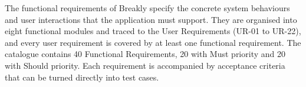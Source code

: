 \newcommand{\frone}[5]{#1 & #2 & #3 & #4 & #5 \\ \hline}
\newcommand{\frfirst}[5]{#1 & #2 & #3 & #4 & #5 \\ \cline{4-4}}
\newcommand{\acnext}[1]{ & & & #1 & \\ \cline{4-4}}
\newcommand{\acend}[1]{ & & & #1 & \\ \hline}

The functional requirements of Breakly specify the concrete system behaviours
and user interactions that the application must support. They are organised
into eight functional modules and traced to the User Requirements
(UR-01 to UR-22), and every user requirement is covered by at least one
functional requirement. The catalogue contains 40 Functional Requirements,
20 with Must priority and 20 with Should priority. Each requirement is
accompanied by acceptance criteria that can be turned directly into test
cases.

